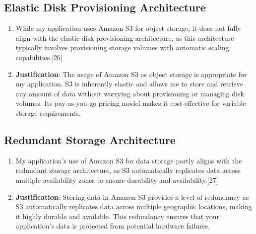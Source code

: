 \subsection{Elastic Disk Provisioning Architecture}
\begin{enumerate}
    \item While my application uses Amazon S3 for object storage, it does not fully align with the elastic disk provisioning architecture, as this architecture typically involves provisioning storage volumes with automatic scaling capabilities.[26]
    
    \item \textbf{Justification}: The usage of Amazon S3 as object storage is appropriate for my application. S3 is inherently elastic and allows me to store and retrieve any amount of data without worrying about provisioning or managing disk volumes. Its pay-as-you-go pricing model makes it cost-effective for variable storage requirements.
\end{enumerate}

\subsection{Redundant Storage Architecture}
\begin{enumerate}
    \item My application's use of Amazon S3 for data storage partly aligns with the redundant storage architecture, as S3 automatically replicates data across multiple availability zones to ensure durability and availability.[27]
    
    \item \textbf{Justification}: Storing data in Amazon S3 provides a level of redundancy as S3 automatically replicates data across multiple geographic locations, making it highly durable and available. This redundancy ensures that your application's data is protected from potential hardware failures.
\end{enumerate}

